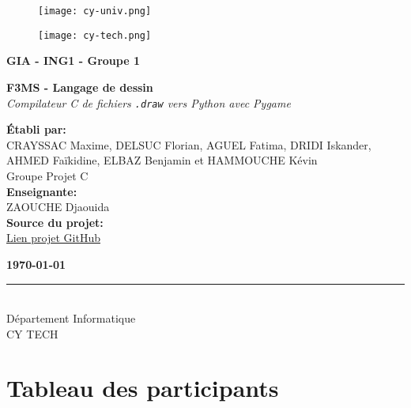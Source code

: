 \documentclass[12pt,a4paper]{article}
\begin{document}
\begin{titlepage}
    \centering
    
    \begin{figure}[h!]
        \centering
        \begin{minipage}{0.45\textwidth}
            \centering
            \texttt{[image: cy-univ.png]}
        \end{minipage}
        \hspace{0.5cm}
        \begin{minipage}{0.45\textwidth}
            \centering
            \texttt{[image: cy-tech.png]}
        \end{minipage}
    \end{figure}

    {\LARGE\bfseries GIA - ING1 - Groupe 1 \\[0.5cm]}

    {\huge\bfseries F3MS - Langage de dessin \\[0.4cm]}
    {\large\itshape Compilateur C de fichiers \texttt{.draw} vers Python avec Pygame \\[1cm]}
    
    \vfill

    \textbf{Établi par:} \\[0.2cm]
    {\Large CRAYSSAC Maxime, DELSUC Florian, AGUEL Fatima, DRIDI Iskander, AHMED Faïkidine, ELBAZ Benjamin et HAMMOUCHE Kévin \\}
    Groupe Projet C \\[0.5cm]
    
    \textbf{Enseignante:} \\[0.2cm]
    {\Large ZAOUCHE Djaouida} \\[1cm]

    \vfill
    \textbf{Source du projet:} \\[0.2cm] 
    \href{https://github.com/mcrayssac/F3MS-drawing-language}{Lien projet GitHub}

    \vfill
    {\large\bfseries \today}

    \vfill
    \rule{0.7\textwidth}{0.4pt} \\[0.2cm]
    {\large Département Informatique} \\[0.1cm]
    CY TECH
\end{titlepage}

\newpage
\tableofcontents

\newpage
\section*{Tableau des participants}
\end{document}
